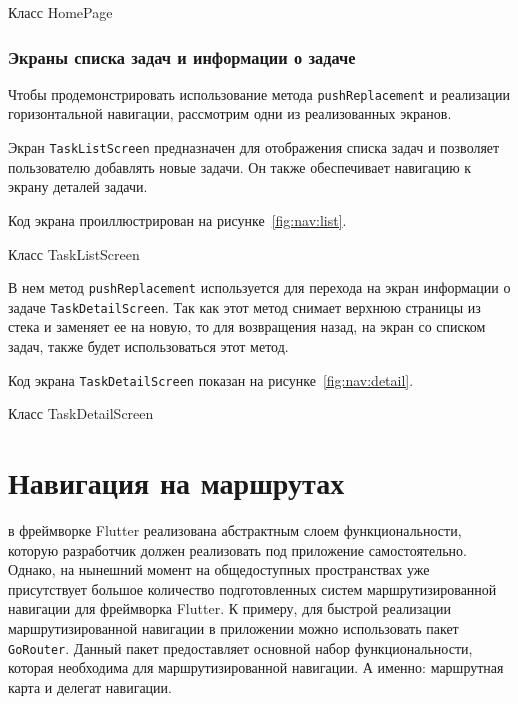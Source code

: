 \begin{image}
	\caption{Класс HomePage}
	\label{fig:nav:stats:show}
\end{image}

\subsubsection{Экраны списка задач и информации о задаче}

Чтобы продемонстрировать использование метода \texttt{pushReplacement}
и реализации горизонтальной навигации,
рассмотрим одни из реализованных экранов.\par
Экран \texttt{TaskListScreen} предназначен
для отображения списка задач и позволяет пользователю добавлять новые задачи.
Он также обеспечивает навигацию к экрану деталей задачи.

Код экрана проиллюстрирован на рисунке~\ref{fig:nav:list}.

\begin{image}
	\caption{Класс TaskListScreen}
	\label{fig:nav:list}
\end{image}

В нем метод \texttt{pushReplacement} используется для перехода
на экран информации о задаче \texttt{TaskDetailScreen}.
Так как этот метод снимает верхнюю страницы из стека и заменяет ее на новую,
то для возвращения назад, на экран со списком задач,
также будет использоваться этот метод.

Код экрана \texttt{TaskDetailScreen} показан на рисунке~\ref{fig:nav:detail}.

\begin{image}
	\caption{Класс TaskDetailScreen}
	\label{fig:nav:detail}
\end{image}

\section{Навигация на маршрутах}

в фреймворке Flutter реализована абстрактным слоем функциональности,
которую разработчик должен реализовать под приложение самостоятельно.
Однако, на нынешний момент на общедоступных пространствах
уже присутствует большое количество подготовленных систем маршрутизированной
навигации для фреймворка Flutter.
К примеру, для быстрой реализации маршрутизированной навигации
в приложении можно использовать пакет \texttt{GoRouter}.
Данный пакет предоставляет основной набор функциональности,
которая необходима для маршрутизированной навигации.
А именно: маршрутная карта и делегат навигации.

